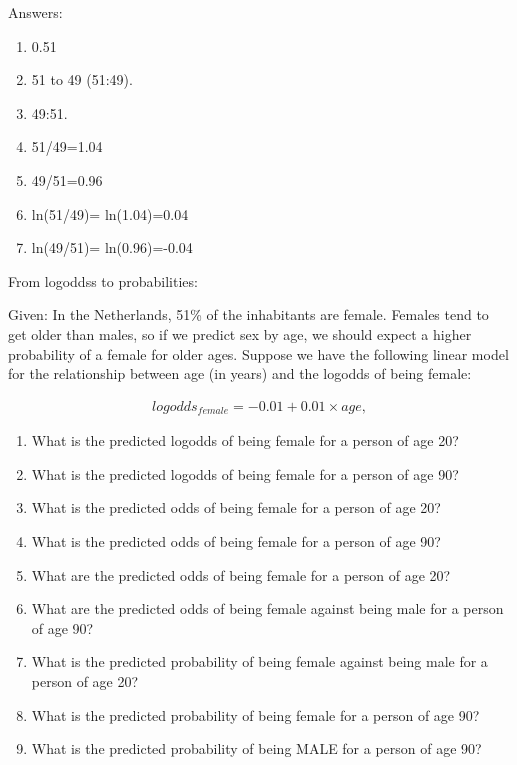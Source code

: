 \documentclass[]{book}\usepackage[]{graphicx}\usepackage[]{color}
\begin{document}
Answers:

\begin{enumerate}

\item
0.51


\item
51 to 49 (51:49).

\item
49:51.

\item
51/49=1.04

\item
49/51=0.96


\item
ln(51/49)= ln(1.04)=0.04

\item
ln(49/51)= ln(0.96)=-0.04


\end{enumerate}

From logoddss to probabilities:

Given:
In the Netherlands, 51\% of the inhabitants are female. Females tend to get older than males, so if we predict sex by age, we should expect a higher probability of a female for older ages. Suppose we have the following linear model for the relationship between age (in years) and the logodds of being female:


\begin{eqnarray}
logodds_{female}=-0.01 + 0.01 \times age, \nonumber
\end{eqnarray}

\begin{enumerate}

\item
What is the predicted logodds of being female for a person of age 20?

\item
What is the predicted logodds of being female for a person of age 90?

\item
What is the predicted odds of being female for a person of age 20?

\item
What is the predicted odds of being female for a person of age 90?

\item
What are the predicted odds of being female for a person of age 20?

\item
What are the predicted odds of being female against being male for a person of age 90?

\item
What is the predicted probability of being female against being male for a person of age 20?

\item
What is the predicted probability of being female for a person of age 90?

\item
What is the predicted probability of being MALE for a person of age 90?


\end{enumerate}
\end{document}
